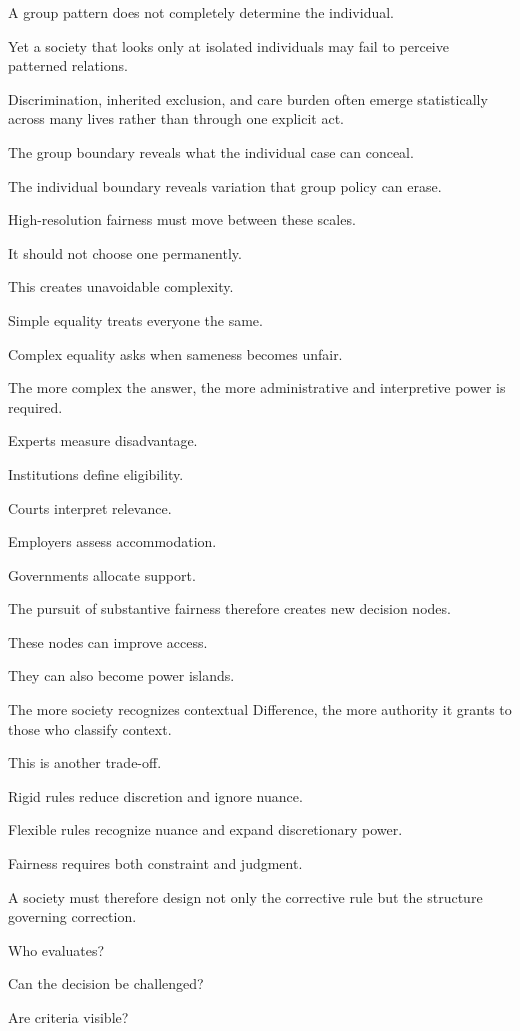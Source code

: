 A group pattern does not completely determine the individual.

Yet a society that looks only at isolated individuals may fail to perceive patterned relations.

Discrimination, inherited exclusion, and care burden often emerge statistically across many lives rather than through one explicit act.

The group boundary reveals what the individual case can conceal.

The individual boundary reveals variation that group policy can erase.

High-resolution fairness must move between these scales.

It should not choose one permanently.

This creates unavoidable complexity.

Simple equality treats everyone the same.

Complex equality asks when sameness becomes unfair.

The more complex the answer, the more administrative and interpretive power is required.

Experts measure disadvantage.

Institutions define eligibility.

Courts interpret relevance.

Employers assess accommodation.

Governments allocate support.

The pursuit of substantive fairness therefore creates new decision nodes.

These nodes can improve access.

They can also become power islands.

The more society recognizes contextual Difference, the more authority it grants to those who classify context.

This is another trade-off.

Rigid rules reduce discretion and ignore nuance.

Flexible rules recognize nuance and expand discretionary power.

Fairness requires both constraint and judgment.

A society must therefore design not only the corrective rule but the structure governing correction.

Who evaluates?

Can the decision be challenged?

Are criteria visible?

